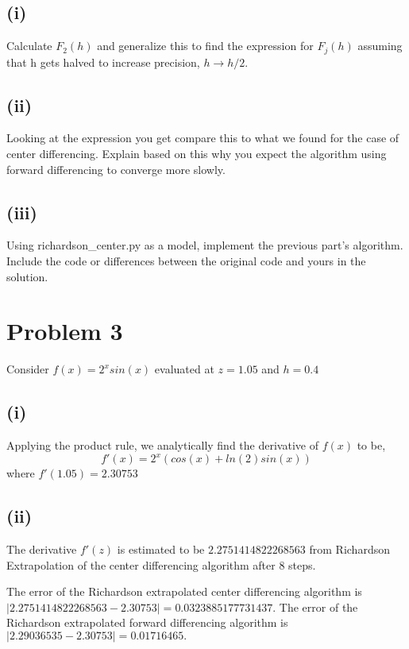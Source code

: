 \documentclass{article}
\begin{document}
\subsection*{(i)}
Calculate $F_2(h)$ and generalize this to ﬁnd the expression for $F_{j}(h)$
assuming that h gets halved to increase precision, $h→ h/2$.

\vspace{60 mm}

\subsection*{(ii)}
Looking at the expression you get compare this to what we found for the case of center
differencing. Explain based on this why you expect the algorithm using forward differencing
to converge more slowly.

\vspace{60 mm}

\subsection*{(iii)}
Using richardson\_center.py as a model, implement the previous part's algorithm.  Include the code or differences 
between the original code and yours in the solution.



\vspace{60 mm}

\section*{Problem 3}
Consider $ f(x) = 2^xsin(x) $ evaluated at $z = 1.05$ and $h = 0.4$

\subsection*{(i)}
Applying the product rule, we analytically find the derivative of $f(x)$ to be,
$$ f'(x) = 2^x(cos(x) + ln(2)sin(x)) $$
where $f'(1.05) = 2.30753$

\subsection*{(ii)}
The derivative $f'(z)$ is estimated to be $2.2751414822268563$ from Richardson Extrapolation of the center differencing
algorithm after 8 steps.

The error of the Richardson extrapolated center differencing algorithm is $|2.2751414822268563 - 2.30753| = 
0.0323885177731437$.  The error of the Richardson extrapolated forward differencing algorithm is $|2.29036535 - 2.30753| = 0.01716465.$
\end{document}

